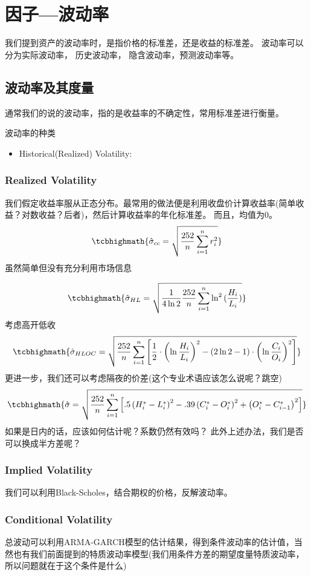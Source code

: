 \section{因子—波动率}
我们提到资产的波动率时，是指价格的标准差，还是收益的标准差。
波动率可以分为实际波动率， 历史波动率， 隐含波动率，预测波动率等。
\subsection{波动率及其度量}
通常我们的说的波动率，指的是收益率的不确定性，常用标准差进行衡量。
\begin{sdefinition}{波动率的种类}{}
\begin{itemize}
	\item Historical(Realized) Volatility: 
\end{itemize}
\end{sdefinition}

\subsubsection{Realized Volatility}
我们假定收益率服从正态分布。最常用的做法便是利用收盘价计算收益率(简单收益？对数收益？后者)，然后计算收益率的年化标准差。
而且，均值为0。
$$
\tcbhighmath{
	\hat \sigma_{cc} = \sqrt{\frac{252}{n}\sum_{i=1}^nr_i^2}
}
$$
虽然简单但没有充分利用市场信息


$$
\tcbhighmath{
	\hat \sigma_{HL} = \sqrt{\frac{1}{4\ln{2}}\frac{252}{n}\sum_{i=1}^n\ln^2{(\frac{H_i}{L_i}})}
}
$$
考虑高开低收
$$
\tcbhighmath{
\hat \sigma_{H L O C}=\sqrt{\frac{252}{n} \sum_{i=1}^n\left[\frac{1}{2} \cdot\left(\ln \frac{H_i}{L_i}\right)^2-(2 \ln 2-1) \cdot\left(\ln \frac{C_i}{O_i}\right)^2\right]}
}
$$
更进一步，我们还可以考虑隔夜的价差(这个专业术语应该怎么说呢？跳空)
$$
\tcbhighmath{
\hat{\sigma}=\sqrt{\frac{252}{n} \sum_{i=1}^n\left[.5\left(H_i^*-L_i^*\right)^2-.39\left(C_i^*-O_i^*\right)^2+\left(O_i^*-C_{i-1}^*\right)^2\right]}
}
$$
如果是日内的话，应该如何估计呢？系数仍然有效吗？
此外上述办法，我们是否可以换成半方差呢？


\subsubsection{Implied Volatility}
我们可以利用Black-Scholes，结合期权的价格，反解波动率。

\subsubsection{Conditional Volatility}
总波动可以利用ARMA-GARCH模型的估计结果，得到条件波动率的估计值，当然也有我们前面提到的特质波动率模型(我们用条件方差的期望度量特质波动率，所以问题就在于这个条件是什么)

